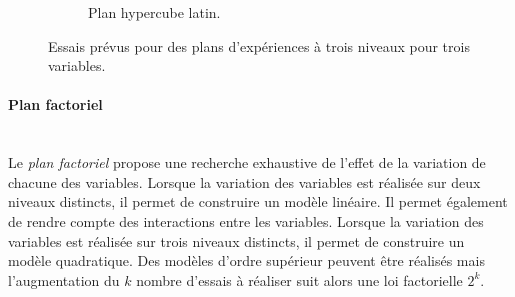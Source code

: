 \begin{figure}[htbp]
\begin{subfigure}[b]{0.30\textwidth}
{
        }
        \newline
        \newline
        \caption{Plan hypercube latin.}
        \label{fig:doe_hls}
    \end{subfigure}
    \caption{Essais prévus pour des plans d'expériences à trois niveaux pour trois variables.}
    \label{fig:doe}
\end{figure}

\paragraph{Plan factoriel}\mbox{\label{parag:doe_factorial}} \\
Le \textit{plan factoriel} propose une recherche exhaustive de l'effet de la variation de chacune des variables.
Lorsque la variation des variables est réalisée sur deux niveaux distincts, il permet de construire un modèle linéaire.
Il permet également de rendre compte des interactions entre les variables.
Lorsque la variation des variables est réalisée sur trois niveaux distincts, il permet de construire un modèle quadratique.
Des modèles d'ordre supérieur peuvent être réalisés mais l'augmentation du $k$ nombre d'essais à réaliser suit alors une loi factorielle $2^k$.

